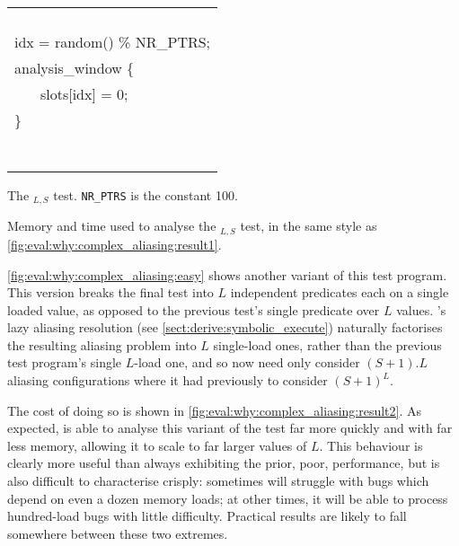 \begin{sanefig}
{{{\begin{tabular}{ll}
        \\
        \\
        \\
        \\
        \\
        \multicolumn{2}{l}{idx = random() \% NR\_PTRS;}\\
        \multicolumn{2}{l}{analysis\_window \{} \\
        & slots[idx] = 0; \\
        \multicolumn{2}{l}{\}}\\
        \\
        \\
        \\
        \\
        \\
        \\
        \\
      \end{tabular}
    }
  }
  }
  {\hfill}
  \caption{The $_{L,S}$ test.
    \texttt{NR\_PTRS} is the constant 100.}
  \label{fig:eval:why:complex_aliasing:easy}
\end{sanefig}

\begin{sanefig}
  \caption{Memory and time used to analyse the
    $_{L,S}$ test, in the same style as
    \autoref{fig:eval:why:complex_aliasing:result1}.}
  \label{fig:eval:why:complex_aliasing:result2}
\end{sanefig}

\autoref{fig:eval:why:complex_aliasing:easy} shows another variant of
this test program.  This version breaks the final test into $L$
independent predicates each on a single loaded value, as opposed to
the previous test's single predicate over $L$ values.  {\technique}'s
lazy aliasing resolution (see \autoref{sect:derive:symbolic_execute})
naturally factorises the resulting aliasing problem into $L$
single-load ones, rather than the previous test program's single
$L$-load one, and so {\implementation} now need only consider $(S+1).L$
aliasing configurations where it had previously to consider $(S+1)^L$.

The cost of doing so is shown in
\autoref{fig:eval:why:complex_aliasing:result2}.  As expected,
        {\implementation} is able to analyse this variant of the test far
        more quickly and with far less memory, allowing it to scale to
        far larger values of $L$.\kern1pt  This behaviour is clearly more useful than
        always exhibiting the prior, poor, performance, but is also
        difficult to characterise crisply: sometimes {\implementation} will
        struggle with bugs which depend on even a dozen memory loads;
        at other times, it will be able to process hundred-load bugs
        with little difficulty.  Practical results are likely to fall
        somewhere between these two extremes.

